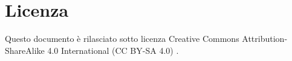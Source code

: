 \documentclass[../../relazione.tex]{subfiles}
\begin{document}
\section{Licenza}
Questo documento è rilasciato sotto licenza Creative Commons Attribution-ShareAlike 4.0 International (CC BY-SA 4.0) \cite{CreativeCommons4.0}.
\end{document}
